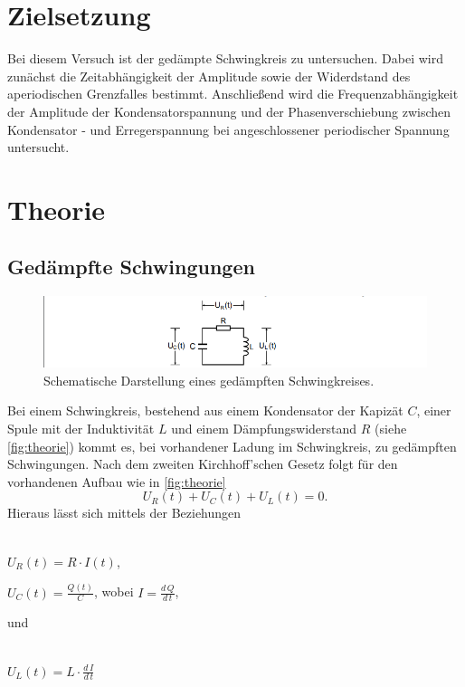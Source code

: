 \section{Zielsetzung}
    Bei diesem Versuch ist der gedämpte Schwingkreis zu untersuchen. Dabei wird zunächst die Zeitabhängigkeit der Amplitude sowie
    der Widerdstand des aperiodischen Grenzfalles bestimmt. Anschließend wird die Frequenzabhängigkeit der Amplitude der Kondensatorspannung
    und der Phasenverschiebung zwischen Kondensator - und Erregerspannung bei angeschlossener periodischer Spannung untersucht.
\section{Theorie}
    \label{sec:Theorie}
    \subsection{Gedämpfte Schwingungen}
        \begin{figure}
            \centering
            \includegraphics[width=\textwidth]{content/theorie.png}
            \caption{Schematische Darstellung eines gedämpften Schwingkreises\cite[284]{V354}.}
            \label{fig:theorie}
        \end{figure} 
        Bei einem Schwingkreis, bestehend aus einem Kondensator der Kapizät $C$, einer Spule mit der Induktivität $L$
        und einem Dämpfungswiderstand $R$ (siehe \autoref{fig:theorie}) kommt es, bei vorhandener Ladung im Schwingkreis, zu gedämpften 
        Schwingungen. Nach dem zweiten Kirchhoff'schen Gesetz folgt für den vorhandenen Aufbau wie in \autoref{fig:theorie}
        \begin{equation}
            \label{eqn:kirchhoff}
            U_R(t) + U_C(t) + U_L(t) = 0.
        \end{equation}
        Hieraus lässt sich mittels der Beziehungen
        \\ \\
        \centerline{$U_R(t) = R \cdot I(t)$,}
        \centerline{$U_C(t) = \frac{Q(t)}{C}$, wobei $I = \frac{d \, Q}{d \, t}$,}
        und
        \\ \\
        \centerline{$U_L(t) = L \cdot \frac {d \, I} {d \, t} $}

